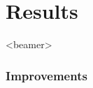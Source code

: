 \section{Results}
\begin{frame}<beamer>
\frametitle{Improvements}
\tableofcontents[currentsection]
\end{frame}
